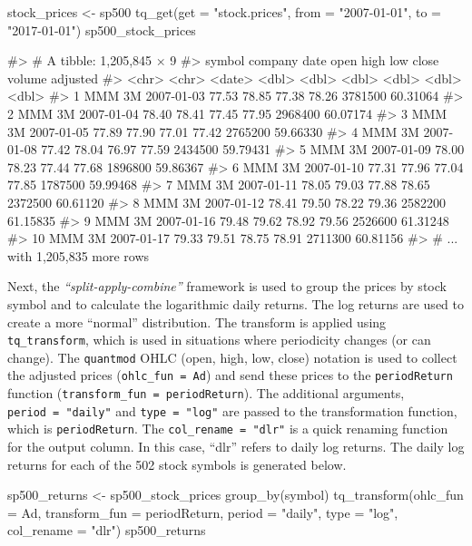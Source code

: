 \begin{Schunk}
\begin{Sinput}
stock_prices <- sp500 %
    tq_get(get  = "stock.prices", 
           from = "2007-01-01", 
           to   = "2017-01-01")
sp500_stock_prices
\end{Sinput}
\end{Schunk}

\begin{Schunk}
\begin{Soutput}
#> # A tibble: 1,205,845 × 9
#>    symbol company       date  open  high   low close  volume adjusted
#>     <chr>   <chr>     <date> <dbl> <dbl> <dbl> <dbl>   <dbl>    <dbl>
#> 1     MMM      3M 2007-01-03 77.53 78.85 77.38 78.26 3781500 60.31064
#> 2     MMM      3M 2007-01-04 78.40 78.41 77.45 77.95 2968400 60.07174
#> 3     MMM      3M 2007-01-05 77.89 77.90 77.01 77.42 2765200 59.66330
#> 4     MMM      3M 2007-01-08 77.42 78.04 76.97 77.59 2434500 59.79431
#> 5     MMM      3M 2007-01-09 78.00 78.23 77.44 77.68 1896800 59.86367
#> 6     MMM      3M 2007-01-10 77.31 77.96 77.04 77.85 1787500 59.99468
#> 7     MMM      3M 2007-01-11 78.05 79.03 77.88 78.65 2372500 60.61120
#> 8     MMM      3M 2007-01-12 78.41 79.50 78.22 79.36 2582200 61.15835
#> 9     MMM      3M 2007-01-16 79.48 79.62 78.92 79.56 2526600 61.31248
#> 10    MMM      3M 2007-01-17 79.33 79.51 78.75 78.91 2711300 60.81156
#> # ... with 1,205,835 more rows
\end{Soutput}
\end{Schunk}

Next, the \emph{``split-apply-combine''} framework is used to group the
prices by stock symbol and to calculate the logarithmic daily returns.
The log returns are used to create a more ``normal'' distribution. The
transform is applied using \texttt{tq\_transform}, which is used in
situations where periodicity changes (or can change). The
\texttt{quantmod} OHLC (open, high, low, close) notation is used to
collect the adjusted prices (\texttt{ohlc\_fun\ =\ Ad}) and send these
prices to the \texttt{periodReturn} function
(\texttt{transform\_fun\ =\ periodReturn}). The additional arguments,
\texttt{period\ =\ "daily"} and \texttt{type\ =\ "log"} are passed to
the transformation function, which is \texttt{periodReturn}. The
\texttt{col\_rename\ =\ "dlr"} is a quick renaming function for the
output column. In this case, ``dlr'' refers to daily log returns. The
daily log returns for each of the 502 stock symbols is generated below.

\begin{Schunk}
\begin{Sinput}
sp500_returns <- sp500_stock_prices %
    group_by(symbol) %
    tq_transform(ohlc_fun = Ad, transform_fun = periodReturn, 
                 period = "daily", type = "log", col_rename = "dlr")
sp500_returns
\end{Sinput}
\end{Schunk}

